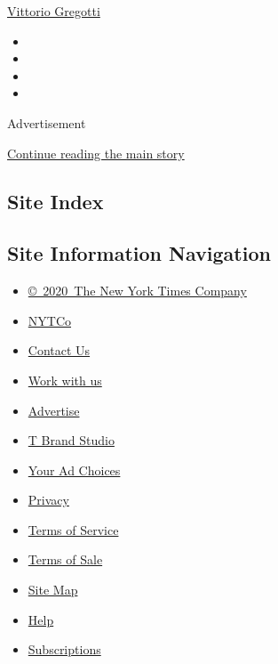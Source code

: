 \protect\hyperlink{vittorio-gregotti}{Vittorio Gregotti}

\begin{itemize}
\item
\item
\item
\item
\end{itemize}

Advertisement

\protect\hyperlink{after-bottom}{Continue reading the main story}

\hypertarget{site-index}{%
\subsection{Site Index}\label{site-index}}

\hypertarget{site-information-navigation}{%
\subsection{Site Information
Navigation}\label{site-information-navigation}}

\begin{itemize}
\tightlist
\item
  \href{https://help.nytimes3xbfgragh.onion/hc/en-us/articles/115014792127-Copyright-notice}{©~2020~The
  New York Times Company}
\end{itemize}

\begin{itemize}
\tightlist
\item
  \href{https://www.nytco.com/}{NYTCo}
\item
  \href{https://help.nytimes3xbfgragh.onion/hc/en-us/articles/115015385887-Contact-Us}{Contact
  Us}
\item
  \href{https://www.nytco.com/careers/}{Work with us}
\item
  \href{https://nytmediakit.com/}{Advertise}
\item
  \href{http://www.tbrandstudio.com/}{T Brand Studio}
\item
  \href{https://www.nytimes3xbfgragh.onion/privacy/cookie-policy\#how-do-i-manage-trackers}{Your
  Ad Choices}
\item
  \href{https://www.nytimes3xbfgragh.onion/privacy}{Privacy}
\item
  \href{https://help.nytimes3xbfgragh.onion/hc/en-us/articles/115014893428-Terms-of-service}{Terms
  of Service}
\item
  \href{https://help.nytimes3xbfgragh.onion/hc/en-us/articles/115014893968-Terms-of-sale}{Terms
  of Sale}
\item
  \href{https://spiderbites.nytimes3xbfgragh.onion}{Site Map}
\item
  \href{https://help.nytimes3xbfgragh.onion/hc/en-us}{Help}
\item
  \href{https://www.nytimes3xbfgragh.onion/subscription?campaignId=37WXW}{Subscriptions}
\end{itemize}
